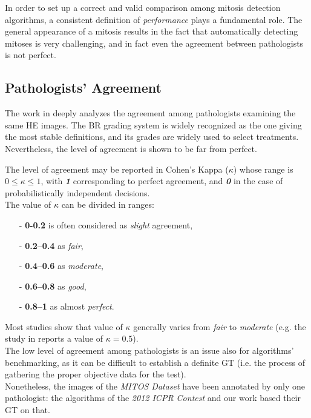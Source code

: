 In order to set up a correct and valid comparison among mitosis detection algorithms, a consistent definition of \textit{performance} plays a fundamental role.
The general appearance of a mitosis results in the fact that automatically detecting mitoses is very challenging, and in fact even the agreement between pathologists is not perfect.

\vspace{0.5cm}

\subsection{Pathologists' Agreement}
\label{ch3:humans}

The work in \cite{mitoticRecognition03Agreement} deeply analyzes the agreement among pathologists examining the same \Gls{HE} images. The \Gls{BR} grading system is widely
recognized as the one giving the most stable definitions, and its grades are widely used to select treatments. Nevertheless, the level of agreement is shown to be far from perfect.

The level of agreement may be reported in Cohen's Kappa ($\kappa$) \cite{cohen1960coefficient} whose range is $0 \leq \kappa \leq 1$, with
\textit{\textbf{1}} corresponding to perfect agreement, and \textit{\textbf{0}} in the case of probabilistically independent decisions.\\

The value of $\kappa$ can be divided in ranges:

\begin{itemize}
 \item [-] \textbf{0-0.2} is often considered as \textit{slight} agreement,
 \item [-] \textbf{0.2–0.4} as \textit{fair},
 \item [-] \textbf{0.4–0.6} as \textit{moderate},
 \item [-] \textbf{0.6–0.8} as \textit{good},
 \item [-] \textbf{0.8–1} as almost \textit{perfect}.
\end{itemize}

Most studies show that value of $\kappa$ generally varies from \textit{fair} to \textit{moderate} (e.g. the study in \cite{meyer2005breast} reports a value of $\kappa = 0.5$).\\
The low level of agreement among pathologists is an issue also for algorithms' benchmarking, as it can be difficult to establish a definite \Gls{GT} (i.e. the process of gathering the proper objective data for the test).\\
Nonetheless, the images of the \textit{MITOS Dataset} have been annotated by only one pathologist: the algorithms of the \textit{2012 ICPR Contest} and our work based their \Gls{GT} on that.

